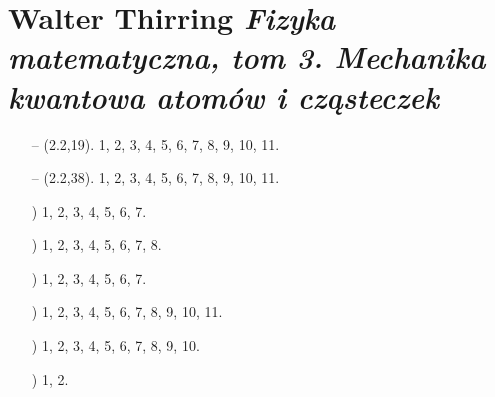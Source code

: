 \documentclass[a4paper,11pt]{article}
\numberwithin{equation}{section}
\begin{document}
\section{Walter Thirring \textit{Fizyka matematyczna, tom 3.
    Mechanika kwantowa atomów i cząsteczek}}

\label{sec:Oznaczenia-i-konwencje}


\begin{itemize}

\item[--] (2.2,19). 1, 2, 3, 4, 5, 6, 7, 8, 9, 10, 11.

\item[--] (2.2,38). 1, 2, 3, 4, 5, 6, 7, 8, 9, 10, 11.

\item[\romannumeral4)] 1, 2, 3, 4, 5, 6, 7.

\item[\romannumeral5)] 1, 2, 3, 4, 5, 6, 7, 8.

\item[\romannumeral6)] 1, 2, 3, 4, 5, 6, 7.

\item[\romannumeral7)] 1, 2, 3, 4, 5, 6, 7, 8, 9, 10, 11.

\item[\romannumeral8)] 1, 2, 3, 4, 5, 6, 7, 8, 9, 10.

\item[\romannumeral9)] 1, 2.











\end{itemize}











% 







\end{document}
